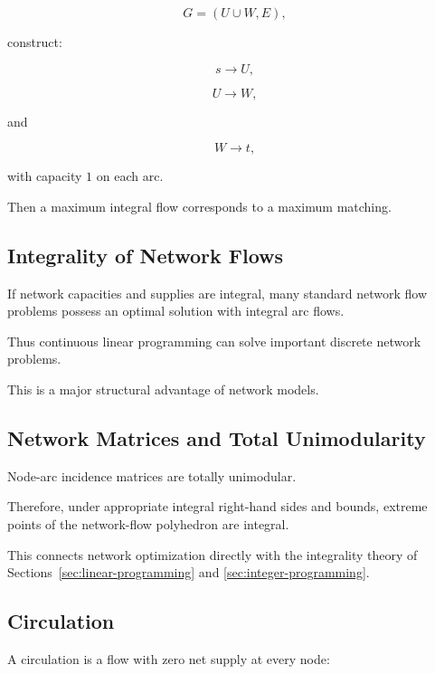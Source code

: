 \[
G=(U\cup W,E),
\]

construct:

\[
\boxed{
s\to U,
}
\]

\[
\boxed{
U\to W,
}
\]

and

\[
\boxed{
W\to t,
}
\]

with capacity \(1\) on each arc.

Then a maximum integral flow corresponds to a maximum matching.

\subsection{Integrality of Network Flows}
\label{subsec:network-flow-integrality}

If network capacities and supplies are integral, many standard network
flow problems possess an optimal solution with integral arc flows.

Thus continuous linear programming can solve important discrete network
problems.

This is a major structural advantage of network models.

\subsection{Network Matrices and Total Unimodularity}
\label{subsec:network-total-unimodularity}

Node-arc incidence matrices are totally unimodular.

Therefore, under appropriate integral right-hand sides and bounds, extreme
points of the network-flow polyhedron are integral.

This connects network optimization directly with the integrality theory of
Sections~\ref{sec:linear-programming} and
\ref{sec:integer-programming}.

\subsection{Circulation}
\label{subsec:network-circulation}

A circulation is a flow with zero net supply at every node:


